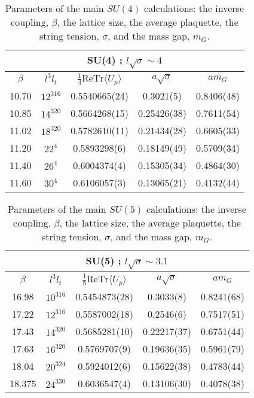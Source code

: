 \documentclass[12pt]{article}
\begin{document}
\begin{table}[htb]
\centering
\begin{tabular}{|cc|ccc|} \hline
\multicolumn{5}{|c|}{SU(4) ; $l\surd\sigma\sim 4$}  \\ \hline
$\beta$ & $l^3l_t$ & $\tfrac{1}{4}\text{ReTr}\langle U_p\rangle$ & 
$a\surd\sigma$ & $am_G$  \\ \hline
10.70  & $12^316$ & 0.5540665(24)  & 0.3021(5)   & 0.8406(48)  \\
10.85  & $14^320$ & 0.5664268(15)  & 0.25426(38)  & 0.7611(54)  \\
11.02  & $18^320$ & 0.5782610(11)  & 0.21434(28)  & 0.6605(33)  \\
11.20  & $22^4$   & 0.5893298(6)  & 0.18149(49)  & 0.5709(34)  \\
11.40  & $26^4$   & 0.6004374(4)  & 0.15305(34)  & 0.4864(30)  \\
11.60  & $30^4$   & 0.6106057(3)  & 0.13065(21)  & 0.4132(44)  \\ \hline
\end{tabular}
\caption{Parameters of the main $SU(4)$ calculations: the inverse coupling, $\beta$, the lattice size, the
  average plaquette, the string tension, $\sigma$, and the  mass gap, $m_G$.}
\label{table_param_SU4}
\end{table}

\begin{table}[htb]
\centering
\begin{tabular}{|cc|ccc|} \hline
\multicolumn{5}{|c|}{SU(5) ; $l\surd\sigma\sim 3.1$} \\ \hline
 $\beta$ & $l^3l_t$ & $\tfrac{1}{5}\text{ReTr}\langle U_p\rangle$ & 
$a\surd\sigma$ & $am_G$  \\ \hline
16.98   & $10^316$  & 0.5454873(28)  & 0.3033(8)    & 0.8241(68)  \\
17.22   & $12^316$  & 0.5587002(18)  & 0.2546(6)    & 0.7517(51)  \\
17.43   & $14^320$  & 0.5685281(10)  & 0.22217(37)  & 0.6751(44)  \\
17.63   & $16^320$  & 0.5769707(9)   & 0.19636(35)  & 0.5961(79)  \\
18.04   & $20^324$  & 0.5924012(6)   & 0.15622(38)  & 0.4783(44)  \\
18.375  & $24^330$  & 0.6036547(4)   & 0.13106(30)  & 0.4078(38)  \\ \hline
\end{tabular}
\caption{Parameters of the main $SU(5)$ calculations: the inverse coupling, $\beta$, the lattice size, the
  average plaquette, the string tension, $\sigma$, and the  mass gap, $m_G$.}
\label{table_param_SU5}
\end{table}
\end{document}
